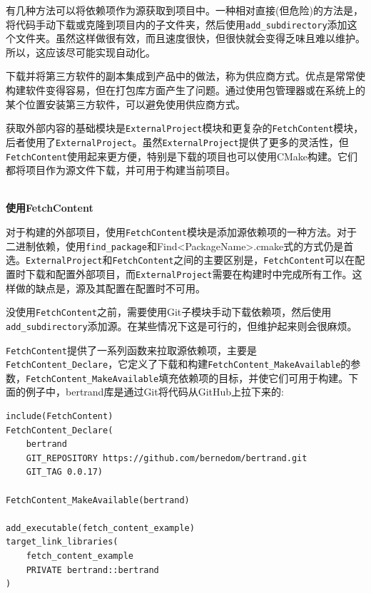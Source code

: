 

有几种方法可以将依赖项作为源获取到项目中。一种相对直接(但危险)的方法是，将代码手动下载或克隆到项目内的子文件夹，然后使用\texttt{add\_subdirectory}添加这个文件夹。虽然这样做很有效，而且速度很快，但很快就会变得乏味且难以维护。所以，这应该尽可能实现自动化。

\begin{tcolorbox}[colback=webgreen!5!white,colframe=webgreen!75!black,title=Note]
下载并将第三方软件的副本集成到产品中的做法，称为供应商方式。优点是常常使构建软件变得容易，但在打包库方面产生了问题。通过使用包管理器或在系统上的某个位置安装第三方软件，可以避免使用供应商方式。
\end{tcolorbox}


获取外部内容的基础模块是\texttt{ExternalProject}模块和更复杂的\texttt{FetchContent}模块，后者使用了\texttt{ExternalProject}。虽然\texttt{ExternalProject}提供了更多的灵活性，但\texttt{FetchContent}使用起来更方便，特别是下载的项目也可以使用CMake构建。它们都将项目作为源文件下载，并可用于构建当前项目。

\hspace*{\fill} \\ %
\noindent
\textbf{使用FetchContent}

对于构建的外部项目，使用\texttt{FetchContent}模块是添加源依赖项的一种方法。对于二进制依赖，使用\texttt{find\_package}和Find<PackageName>.cmake式的方式仍是首选。\texttt{ExternalProject}和\texttt{FetchContent}之间的主要区别是，\texttt{FetchContent}可以在配置时下载和配置外部项目，而\texttt{ExternalProject}需要在构建时中完成所有工作。这样做的缺点是，源及其配置在配置时不可用。

没使用\texttt{FetchContent}之前，需要使用Git子模块手动下载依赖项，然后使用\texttt{add\_subdirectory}添加源。在某些情况下这是可行的，但维护起来则会很麻烦。

\texttt{FetchContent}提供了一系列函数来拉取源依赖项，主要是\texttt{FetchContent\_Declare}，它定义了下载和构建\texttt{FetchContent\_MakeAvailable}的参数，\texttt{FetchContent\_MakeAvailable}填充依赖项的目标，并使它们可用于构建。下面的例子中，bertrand库是通过Git将代码从GitHub上拉下来的:

\begin{lstlisting}[style=styleCMake]
include(FetchContent)
FetchContent_Declare(
	bertrand
	GIT_REPOSITORY https://github.com/bernedom/bertrand.git
	GIT_TAG 0.0.17)

FetchContent_MakeAvailable(bertrand)

add_executable(fetch_content_example)
target_link_libraries(
	fetch_content_example
	PRIVATE bertrand::bertrand
)
\end{lstlisting}

